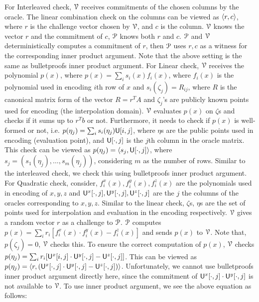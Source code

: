 For Interleaved check, $\mathcal{V}$ receives commitments of the chosen columns by the oracle. The linear combination check on the columns can be viewed as $\langle r,c\rangle$, where $r$ is the challenge vector chosen by $\mathcal{V}$, and $c$ is the column. $\mathcal{V}$ knows the vector $r$ and the commitment of $c$, $\mathcal{P}$ knows both $r$ and $c$. $\mathcal{P}$ and $\mathcal{V}$ deterministically computes a commitment of $r$, then $\mathcal{P}$ uses $r, c$ as a witness for the corresponding inner product argument. Note that the above setting is the same as bulletproofs inner product argument.
For Linear check, $\mathcal{V}$ receives the polynomial $p(x)$, where $p(x) = \sum_i s_i(x) f_i(x)$, where $f_i(x)$ is the polynomial used in encoding $i$th row of $x$ and $s_i(\zeta_j) = R_{ij}$, where $R$ is the canonical matrix form of the vector $R = r^TA$ and $\zeta_j$'s are publicly known points used for encoding (the interpolation domain). $\mathcal{V}$ evaluates $p(x)$ on $\zeta$s and checks if it sums up to $r^Tb$ or not. Furthermore, it needs to check if $p(x)$ is well-formed or not, i.e. $p(\eta_j) = \sum_i s_i(\eta_j) \mathsf{U}[i,j]$, where $\eta$s are the public points used in encoding (evaluation point), and $\mathsf{U}[\cdot,j]$ is the $j$th column in the oracle matrix. This check can be viewed as $p(\eta_j) = \langle s_j,\mathsf{U}[\cdot,j]\rangle$, where $s_j = (s_1(\eta_j), \ldots, s_m(\eta_j))$, considering $m$ as the number of rows. Similar to the interleaved check, we check this using bulletproofs inner product argument.
For Quadratic check, consider, $f^x_i(x), f^y_i(x), f^z_i(x)$ are the polynomials used in encoding of $x, y, z$ and $\mathsf{U}^x[\cdot,j], \mathsf{U}^y[\cdot,j], \mathsf{U}^z[\cdot, j]$ are the $j$ the columns of the oracles corresponding to $x, y, z$. Similar to the linear check, $\zeta$s, $\eta$s are the set of points used for interpolation and evaluation in the encoding respectively.  $\mathcal{V}$ gives a random vector $r$ as a challenge to $\mathcal{P}$. $\mathcal{P}$ computes $p(x) = \sum_i r_i [ f^x_i (x) \cdot f^y_i(x) - f^z_i(x)]$ and sends $p(x)$ to $\mathcal{V}$. Note that, $p(\zeta_j) = 0$, $\mathcal{V}$ checks this. To ensure the correct computation of $p(x)$, $\mathcal{V}$ checks $p(\eta_j) = \sum_i r_i [ \mathsf{U}^x[i,j] \cdot \mathsf{U}^y[\cdot,j] - \mathsf{U}^z[\cdot,j]]$. This can be viewed as $p(\eta_j) = \langle r,(\mathsf{U}^x[\cdot,j] \cdot \mathsf{U}^y[\cdot,j] - \mathsf{U}^z[\cdot,j])\rangle$. Unfortunately, we cannot use bulletproofs inner product argument directly here, since the commitment of $\mathsf{U}^x[\cdot,j] \cdot \mathsf{U}^y[\cdot,j]$ is not available to $\mathcal{V}$. To use inner product argument, we see the above equation as follows:
